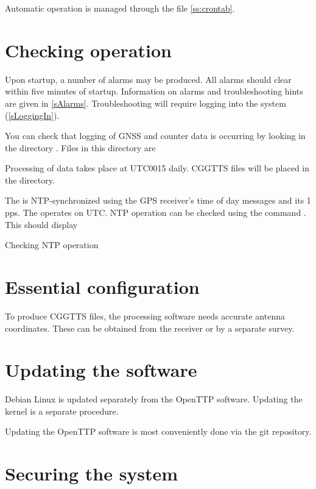 Automatic operation is managed through the   file \ref{ss:crontab}.
\section{Checking  operation}

Upon startup, a number of alarms may be produced. 
All alarms should clear within five minutes of startup.
Information on alarms and troubleshooting hints are given in \ref{sAlarms}. Troubleshooting
will require logging into the system (\ref{sLoggingIn}).

You can check that logging of GNSS and counter data is occurring by looking in the directory 
. Files in this directory are 

Processing of data takes place at UTC0015 daily. CGGTTS files will be placed in the 
 directory.

The \sysname{} is NTP-synchronized using the GPS receiver's time of day messages and its 1 pps. 
The \sysname{} operates on UTC. 
NTP operation can be checked using the command . This should display 

\begin{table}[j]
\caption{Checking NTP operation}
\end{table}

\section{Essential configuration}

To produce CGGTTS files, the processing software needs accurate antenna coordinates.
These can be obtained from the \sysname{} receiver or by a separate survey.

\section{Updating the software}

Debian Linux is updated separately from the OpenTTP software.
Updating the kernel is a separate procedure. 

Updating the OpenTTP software is most conveniently done via the git repository.


\section{Securing the system}



